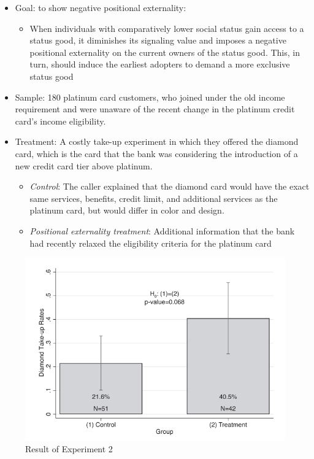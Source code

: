 \documentclass[../root]{subfiles}
\begin{document}
    \begin{itemize}
        \item Goal: to show negative positional externality: 
        \begin{itemize}
            \item When individuals with comparatively lower social status gain access to a status good, it diminishes its signaling value and imposes a negative positional externality on the current owners of the status good. This, in turn, should induce the earliest adopters to demand a more exclusive status good
        \end{itemize}
        \item Sample: 180 platinum card customers, who joined under the old income requirement and were unaware of the recent change in the platinum credit card's income eligibility.
        \item Treatment: A costly take-up experiment in which they offered the diamond card, which is the card that the bank was considering the introduction of a new credit card tier above platinum.
        \begin{itemize}
            \item \textit{Control}: The caller explained that the diamond card would have the exact same services, benefits, credit limit, and additional services as the platinum card, but would differ in color and design.
            \item \textit{Positional externality treatment}: Additional information that the bank had recently relaxed the eligibility criteria for the platinum card
        \end{itemize}
    \end{itemize}

    \begin{figure}[h]
        \centering
        \includegraphics[width = 0.8\linewidth]{0717kato/result_exp2.PNG}
        \caption{Result of Experiment 2}
        \label{result3}
    \end{figure}
\end{document}
